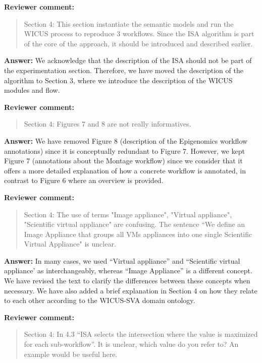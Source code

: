 \documentclass{letter}
\newenvironment{review}%
{\textbf{Reviewer comment:}\begin{quote}}%
{\end{quote}}%
\newcommand{\answer}[1]{%
      \textbf{Answer:} #1}
\begin{document}
\begin{letter}{}
\begin{review}
Section 4: This section instantiate the semantic models and run the WICUS process to reproduce 3 workflows. Since the ISA algorithm is part of the core of the approach, it should be introduced and described earlier.
\end{review}

\answer{We acknowledge that the description of the ISA should not be part of the experimentation section. Therefore, we have moved the description of the algorithm to Section 3, where we introduce the description of the WICUS modules and flow.}


\begin{review}
Section 4: Figures 7 and 8 are not really informatives.
\end{review}

\answer{We have removed Figure 8 (description of the Epigenomics workflow annotations) since it is conceptually redundant to Figure 7. However, we kept Figure 7 (annotations about the Montage workflow) since we consider that it offers a more detailed explanation of how a concrete workflow is annotated, in contrast to Figure 6 where an overview is provided.}


\begin{review}
Section 4: The use of terms "Image appliance", "Virtual appliance", "Scientific virtual appliance" are confusing. The sentence ``We define an Image Appliance that groups all VMs appliances into one single Scientific Virtual Appliance" is unclear.
\end{review}

\answer{In many cases, we used ``Virtual appliance'' and ``Scientific virtual appliance' as interchangeably, whereas ``Image Appliance'' is a different concept. We have revised the text to clarify the differences between these concepts when necessary. We have also added a brief explanation in Section 4 on how they relate to each other according to the WICUS-SVA domain ontology.}


\begin{review}
Section 4: In 4.3 ``ISA selects the intersection where the value is maximized for each sub-workflow''. It is unclear, which value do you refer to? An example would be useful here.
\end{review}


\end{letter}
\end{document}
